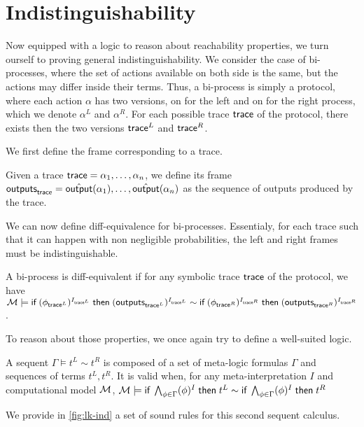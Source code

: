 \section{Indistinguishability}

Now equipped with a logic to reason about reachability properties, we turn ourself to proving general indistinguishability. We consider the case of bi-processes, where the set of actions available on both side is the same, but the actions may differ inside their terms. Thus, a bi-process is simply a protocol, where each action $\alpha$ has two versions, on for the left and on for the right process, which we denote $\alpha^L$ and $\alpha^R$. For each possible trace $\textsf{trace}$ of the protocol, there exists then the two versions $\textsf{trace}^L$ and $\textsf{trace}^R$.


We first define the frame corresponding to a trace.
\begin{definition}
  Given a trace $\textsf{trace} = \alpha_1,\dots,\alpha_n$, we define its frame $\textsf{outputs}_{\textsf{trace}} = \hat{\textsf{output}}(\alpha_1),\dots,\hat{\textsf{output}}(\alpha_n)$ as  the sequence of outputs produced by the trace.
\end{definition}

We can now define diff-equivalence for bi-processes. Essentialy, for each trace such that it can happen with non negligible probabilities, the left and right frames must be indistinguishable.

\begin{definition}
  A bi-process is diff-equivalent if for any symbolic trace $\textsf{trace}$ of the protocol,
  we have $\mathcal{M} \models \textsf{if}\; (\phi_{\textsf{trace}^L})^{I_{\textsf{trace}^L}} \;\textsf{then}\; (\textsf{outputs}_{\textsf{trace}^L})^{I_{\textsf{trace}^L}} \sim   \textsf{if}\; (\phi_{\textsf{trace}^R})^{I_{\textsf{trace}^R}} \;\textsf{then}\; (\textsf{outputs}_{\textsf{trace}^R})^{I_{\textsf{trace}^R}} $.
\end{definition}

To reason about those properties, we once again try to define a well-suited logic.
\begin{definition}
  A sequent $\Gamma \vDash t^L \sim t^R $ is composed of a set of meta-logic formulas
  $\Gamma$ and sequences of terms $t^L,t^R$.
  It is valid when, for any meta-interpretation $I$ and computational model $\mathcal{M}$, $\mathcal{M} \models \textsf{if}\; \bigwedge_{\phi \in \Gamma} (\phi)^I \;\textsf{then}\; t^L \sim  \textsf{if}\; \bigwedge_{\phi \in \Gamma} (\phi)^I \;\textsf{then}\; t^R $
\end{definition}


We provide in \cref{fig:lk-ind} a set of sound rules for this second sequent calculus.

